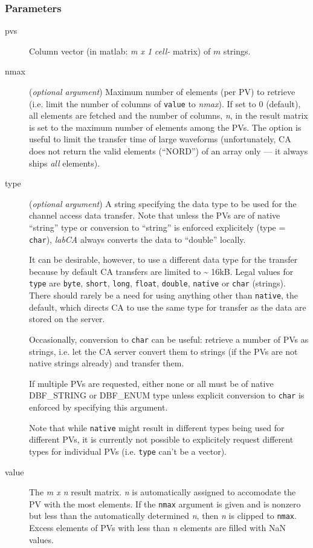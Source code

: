 \documentclass{article}
\newcommand{\sca}{\ita{labCA}}
\newcommand{\com}[1]{{\tt #1}}
\newcommand{\NAN}{\mbox{NaN}}
\newcommand{\ita}[1]{\emph{#1}}
\newcommand{\m}{$m$}
\newcommand{\mhack}{$m$} %
\newcommand{\n}{$n$}
\newcommand{\mxn}{$m\times n$}
\newcommand{\mxl}{$m\times 1$}
\newcommand{\calimit}{$\approx 16$kB}
\renewcommand{\m}{\ita{m}}
\newcommand{\mhack}{\ita{m}} %
\renewcommand{\n}{\ita{n}}
\renewcommand{\mxn}{\ita{m x n}}
\renewcommand{\mxl}{\ita{m x 1}}
\renewcommand{\calimit}{\~{} 16kB}
\newcommand{\PVITEM}{
\item[pvs] Column vector (in matlab: \mxl{} \ita{cell-} matrix)
of \mhack{} strings.
}
\begin{document}
\subsubsection{Parameters}
\begin{description}
\PVITEM
%
%
\item[nmax] \label{nmaxarg}
(\ita{optional argument}) Maximum number of elements
(per PV) to retrieve (i.e. limit the number of columns of \com{value} to
\ita{nmax}).
If set to 0 (default), all elements are fetched
and the number of columns, \n, in the result matrix is set to the
maximum number of elements among the PVs. The option is useful
to limit the transfer time of large waveforms (unfortunately,
CA does not return the valid elements (``NORD'') of
an array only --- it always ships \ita{all} elements).
%
%
\item[type] \label{typearg}
(\ita{optional argument}) A string specifying the
data type to be used for the channel access data transfer. Note
that unless the PVs are of native ``string'' type or conversion to
``string'' is enforced explicitely (type = \com{char}), \sca{}
always converts the data to ``double'' locally.

It can be desirable, however, to use a different data type for the
transfer because by default CA transfers are limited to \calimit.
Legal values for \com{type}{} are \com{byte}, \com{short}, \com{long},
\com{float}, \com{double}, \com{native} or \com{char} (strings).
There should rarely be a need for using anything other than \com{native},
the default, which directs CA to use the same type for transfer as the
data are stored on the server.

Occasionally, conversion to \com{char} can be useful: retrieve a number
of PVs as strings, i.e. let the CA server convert them to strings
(if the PVs are not native strings already) and transfer them.

If multiple PVs are requested, either none or all must be of native
DBF\_STRING or DBF\_ENUM type unless explicit conversion to \com{char}
is enforced by specifying this argument.

Note that while \com{native}{} might result in different types
being used for different PVs, it is currently not possible to
explicitely request different types for individual PVs (i.e.
\com{type}{} can't be a vector).
%
%
\item[value] The \mxn{} result matrix. \n{} is automatically
assigned to accomodate the PV with the most elements. If the \com{nmax}{}
argument is given and is nonzero but less than the automatically
determined \n, then \n{} is clipped to \com{nmax}.
Excess elements of PVs with less than \n{} elements are filled with
\NAN{} values.


\end{description}
\end{document}
